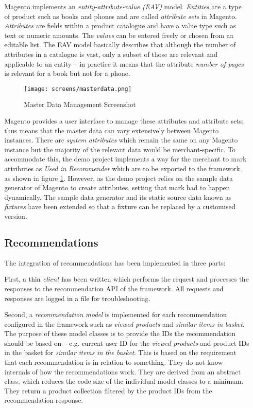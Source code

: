 Magento implements an \emph{entity-attribute-value (EAV)} model. \emph{Entities} are a type of product such as books and phones and are called \emph{attribute sets} in Magento. \emph{Attributes} are fields within a product catalogue and have a value type such as text or numeric amounts. The \emph{values} can be entered freely or chosen from an editable list. The EAV model basically describes that although the number of attributes in a catalogue is vast, only a subset of those are relevant and applicable to an entity -- in practice it means that the attribute \emph{number of pages} is relevant for a book but not for a phone.

\begin{figure}[!ht]
    \texttt{[image: screens/masterdata.png]}
    \caption{Master Data Management Screenshot}
    \label{fig:implementation-magento-master-data}
\end{figure}

Magento provides a user interface to manage these attributes and attribute sets; thus means that the master data can vary extensively between Magento instances. There are \emph{system attributes} which remain the same on any Magento instance but the majority of the relevant data would be merchant-specific. To accommodate this, the demo project implements a way for the merchant to mark attributes as \emph{Used in Recommender} which are to be exported to the framework, as shown in figure \ref{fig:implementation-magento-master-data}. However, as the demo project relies on the sample data generator of Magento to create attributes, setting that mark had to happen dynamically. The sample data generator and its static source data known as \emph{fixtures} have been extended so that a fixture can be replaced by a customised version.

\subsection{Recommendations}

The integration of recommendations has been implemented in three parts:

First, a thin \emph{client} has been written which performs the request and processes the responses to the recommendation API of the framework. All requests and responses are logged in a file for troubleshooting.

Second, a \emph{recommendation model} is implemented for each recommendation configured in the framework such as \emph{viewed products} and \emph{similar items in basket}. The purpose of these model classes is to provide the IDs the recommendation should be based on -- e.g. current user ID for the \emph{viewed products} and product IDs in the basket for \emph{similar items in the basket}. This is based on the requirement that each recommendation is in relation to something. They do not know internals of how the recommendations work. They are derived from an abstract class, which reduces the code size of the individual model classes to a minimum. They return a product collection filtered by the product IDs from the recommendation response.

